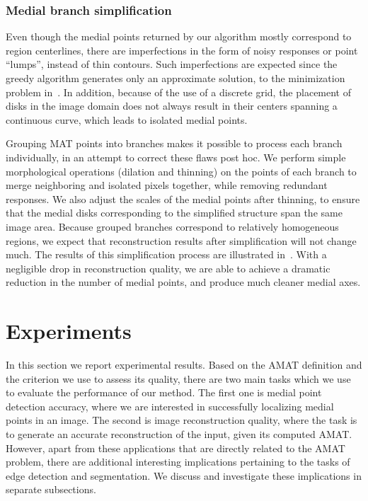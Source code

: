 \documentclass[10pt,twocolumn,letterpaper]{article}
\begin{document}
\subsubsection*{Medial branch simplification}
Even though the medial points returned by our algorithm mostly correspond to region centerlines,
there are imperfections in the form of noisy responses or point ``lumps'', instead of thin contours.
Such imperfections are expected since the greedy algorithm generates only an approximate solution,
to the minimization problem in~. 
In addition, because of the use of a discrete grid, the placement of disks 
in the image domain does not always result in their centers spanning a continuous curve, which leads to
isolated medial points.

Grouping MAT points into branches makes it possible to process each branch individually, in an attempt
to correct these flaws post hoc.
We perform simple morphological operations (dilation and thinning) 
on the points of each branch to merge neighboring and isolated pixels together, while removing 
redundant responses. 
We also adjust the scales of the medial points after thinning, to ensure that the medial disks corresponding 
to the simplified structure span the same image area.
Because grouped branches correspond to relatively homogeneous regions, we expect that reconstruction
results after simplification will not change much.
The results of this simplification process are illustrated in~.
With a negligible drop in reconstruction quality, we are able to achieve a dramatic reduction
in the number of medial points, and produce much cleaner medial axes.







\section{Experiments}\label{sec:experiments}
In this section we report experimental results.
Based on the AMAT definition and the criterion we use to assess its quality, there are two main tasks which we 
use to evaluate the performance of our method. 
The first one is medial point detection accuracy, where we are interested in successfully localizing medial points
in an image.
The second is image reconstruction quality, where the task is to generate an accurate reconstruction of the input,
given its computed AMAT.
However, apart from these applications that are directly related to the AMAT problem, there are additional 
interesting implications pertaining to the tasks of edge detection and segmentation.
We discuss and investigate these implications in separate subsections.
\end{document}
